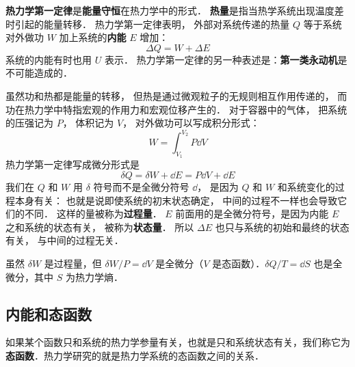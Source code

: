 
\begin{issues}
\issueDraft
\end{issues}


\textbf{热力学第一定律}是\textbf{能量守恒}在热力学中的形式． \textbf{热量}是指当热学系统出现温度差时引起的能量转移． 热力学第一定律表明， 外部对系统传递的热量 $Q$ 等于系统对外做功 $W$ 加上系统的\textbf{内能} $E$ 增加：
\begin{equation}\label{Th1Law_eq1}
\Delta Q = W + \Delta E
\end{equation}
系统的内能有时也用 $U$ 表示． 热力学第一定律的另一种表述是：\textbf{第一类永动机}是不可能造成的．

虽然功和热都是能量的转移， 但热是通过微观粒子的无规则相互作用传递的， 而功在热力学中特指宏观的作用力和宏观位移产生的． 对于容器中的气体， 把系统的压强记为 $P$， 体积记为 $V$， 对外做功可以写成积分形式：
\begin{equation}
W = \int_{V_1}^{V_2} P \dd{V}
\end{equation}
热力学第一定律写成微分形式是
\begin{equation}\label{Th1Law_eq2}
\delta Q = \delta W + \dd E = P\dd V + \dd E
\end{equation}
我们在 $Q$ 和 $W$ 用 $\delta$ 符号而不是全微分符号 $\dd{}$， 是因为 $Q$ 和 $W$ 和系统变化的过程本身有关： 也就是说即使系统的初末状态确定， 中间的过程不一样也会导致它们的不同． 这样的量被称为\textbf{过程量}． $E$ 前面用的是全微分符号，是因为内能 $E$ 之和系统的状态有关， 被称为\textbf{状态量}． 所以 $\Delta E$ 也只与系统的初始和最终的状态有关， 与中间的过程无关．


虽然 $\delta W$ 是过程量，但 $\delta W/P=\dd V$ 是全微分（$V$ 是态函数）．$\delta Q/T=\dd S$ 也是全微分，其中 $S$ 为热力学熵．

\subsection{内能和态函数}
如果某个函数只和系统的热力学参量有关，也就是只和系统状态有关，我们称它为\textbf{态函数}．热力学研究的就是热力学系统的态函数之间的关系．

